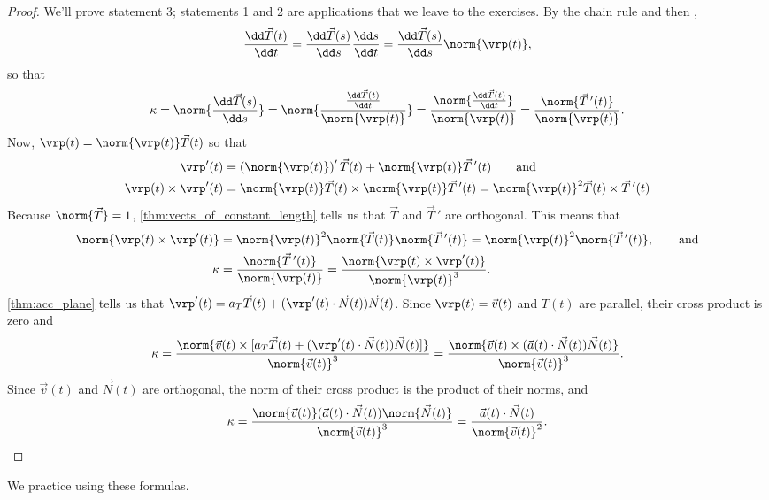 \begin{proof}
We'll prove statement 3; statements 1 and 2 are applications that we leave to the exercises.  By the chain rule and then ,
\[
\frac{\dd\vec T(t)}{\dd t}
=\frac{\dd\vec T(s)}{\dd s}\frac{\dd s}{\dd t}
=\frac{\dd\vec T(s)}{\dd s}\norm{\vrp(t)},
\]
so that\vspace{-.3\baselineskip}
\[
\kappa=\norm{\frac{\dd\vec T(s)}{\dd s}}
=\norm{\frac{\frac{\dd\vec T(t)}{\dd t}}{\norm{\vrp(t)}}}
=\frac{\norm{\frac{\dd\vec T(t)}{\dd t}}}{\norm{\vrp(t)}}
=\frac{\norm{\vec T\,'(t)}}{\norm{\vrp(t)}}.
\]
Now, $\vrp(t)=\norm{\vrp(t)}\vec T(t)$ so that
\begin{align*}
 \vrp'(t)&=\left(\norm{\vrp(t)}\right)'\vec T(t)+\norm{\vrp(t)}\vec T\,'(t)
 \qquad\text{and}\\
 \vrp(t)\times\vrp'(t)
 &=\norm{\vrp(t)}\vec T(t)\times\norm{\vrp(t)}\vec T\,'(t)
 =\norm{\vrp(t)}^2\vec T(t)\times\vec T\,'(t)
\end{align*}
Because $\norm{\vec T}=1$, \autoref{thm:vects_of_constant_length} tells us that $\vec T$ and $\vec T\,'$ are orthogonal.  This means that
\begin{align*}
 \norm{\vrp(t)\times\vrp'(t)}
 &=\norm{\vrp(t)}^2\norm{\vec T(t)}\norm{\vec T\,'(t)}
 =\norm{\vrp(t)}^2\norm{\vec T\,'(t)},\qquad\text{and}\\
 \kappa
 &=\frac{\norm{\vec T\,'(t)}}{\norm{\vrp(t)}}
 =\frac{\norm{\vrp(t)\times\vrp'(t)}}{\norm{\vrp(t)}^3}.
\end{align*}
\autoref{thm:acc_plane} tells us that $\vrp'(t)=a_T\vec T(t)+(\vrp'(t)\cdot\vec N(t))\vec N(t)$.  Since $\vrp(t)=\vec v(t)$ and $T(t)$ are parallel, their cross product is zero and
\[
 \kappa
 =\frac{\norm{\vec v(t)\times[a_T\vec T(t)+(\vrp'(t)\cdot\vec N(t))\vec N(t)]}}
 {\norm{\vec v(t)}^3}
 =\frac{\norm{\vec v(t)\times(\vec a(t)\cdot\vec N(t))\vec N(t)}}{\norm{\vec v(t)}^3}.
\]
Since $\vec v(t)$ and $\vec N(t)$ are orthogonal, the norm of their cross product is the product of their norms, and
\[
\kappa
=\frac{\norm{\vec v(t)}(\vec a(t)\cdot\vec N(t))\norm{\vec N(t)}}{\norm{\vec v(t)}^3}
=\frac{\vec a(t)\cdot\vec N(t)}{\norm{\vec v(t)}^2}.\qedhere
\]
\end{proof}

We practice using these formulas.

